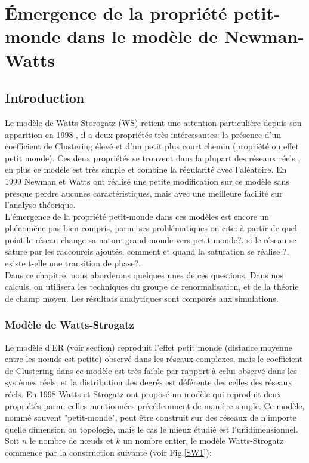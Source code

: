 \chapter{Émergence de la propriété petit-monde dans le modèle de Newman-Watts}
\label{sec3}
\begin{minipage}{\textwidth}
	\linespread{1.2}
	\minitoc
\end{minipage}
\section{Introduction}

Le modèle de Watts-Storogatz (WS) retient une attention particulière depuis son apparition en 1998 \cite{Watss-Strogatz1998}, il a deux propriétés très intéressantes: la présence d'un coefficient de Clustering élevé et d'un petit plus court chemin (propriété ou effet petit monde). Ces deux propriétés se trouvent dans la plupart des réseaux réels \cite{Cohen-Havlinl2010,Newman2010}, en plus ce modèle est très simple et combine la régularité avec l'aléatoire. En $1999$ Newman et Watts \cite{Newman-Watts1999} ont réalisé une petite modification sur ce modèle sans presque perdre aucunes caractéristiques, mais avec  une meilleure facilité  sur l'analyse théorique.\\
L'émergence de la propriété petit-monde dans ces modèles est encore un phénomène pas bien compris, parmi ses problématiques on cite: à partir de quel point le réseau change sa nature grand-monde vers petit-monde?, si le réseau se sature par les raccourcis ajoutés, comment et quand la saturation se réalise ?, existe t-elle  une transition de phase?. \\
Dans ce chapitre, nous aborderons quelques unes de ces questions. Dans nos calculs, on utilisera les techniques du groupe de renormalisation, et de la théorie de champ moyen. Les résultats analytiques sont  comparés aux simulations.

 \subsection{Modèle de Watts-Strogatz}
 
 
 Le modèle d'ER (voir section) reproduit l'effet petit monde (distance moyenne entre les nœuds est petite) observé dans les réseaux complexes, mais le coefficient de Clustering dans ce modèle est très faible par rapport à celui observé dans les systèmes réels, et la distribution des degrés est déférente des celles des réseaux réels. En 1998 Watts et Strogatz \cite{Watss-Strogatz1998} ont proposé un modèle qui reproduit deux propriétés parmi celles mentionnées précédemment de manière simple. Ce modèle, nommé souvent "petit-monde", peut être construit sur des réseaux de n'importe quelle dimension ou topologie, mais le cas le mieux étudié est l'unidimensionnel. Soit $n$ le nombre de nœuds et $k$ un nombre entier, le modèle Watts-Strogatz commence par la construction suivante (voir Fig.\ref{SW1}): 
 
